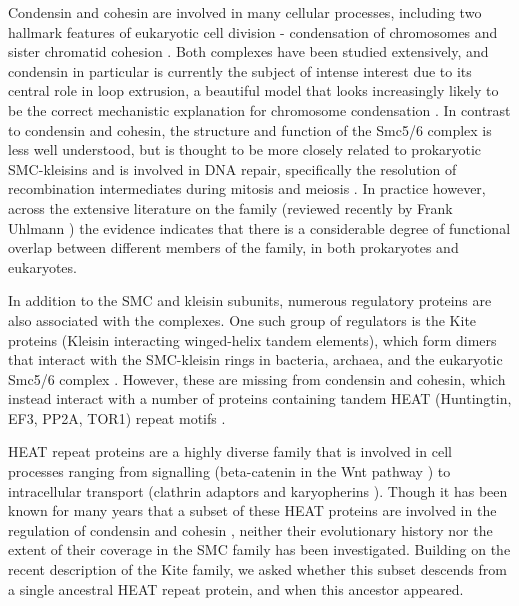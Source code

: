 \documentclass[a4paper,11pt,twoside,openright]{scrbook}
\begin{document}
Condensin and cohesin are involved in many cellular processes, including two
hallmark features of eukaryotic cell division - condensation of chromosomes and
sister chromatid cohesion \cite{Wood2010}. Both complexes have been studied
extensively, and condensin in particular is currently the subject of intense
interest due to its central role in loop extrusion, a beautiful model that looks
increasingly likely to be the correct mechanistic explanation for chromosome
condensation \cite{Nasmyth2001a,Alipour2012,Goloborodko2016,Wang2017}. In
contrast to condensin and cohesin, the structure and function of the Smc5/6
complex is less well understood, but is thought to be more closely related to
prokaryotic SMC-kleisins \cite{Palecek2015} and is involved in DNA repair,
specifically the resolution of recombination intermediates during mitosis and
meiosis \cite{Ampatzidou2006,Farmer2011}. In practice however, across the
extensive literature on the family (reviewed recently by Frank Uhlmann
\cite{Uhlmann2016}) the evidence indicates that there is a considerable degree
of functional overlap between different members of the family, in both
prokaryotes and eukaryotes.

In addition to the SMC and kleisin subunits, numerous regulatory proteins are
also associated with the complexes. One such group of regulators is the Kite
proteins (Kleisin interacting winged-helix tandem elements), which form dimers
that interact with the SMC-kleisin rings in bacteria, archaea, and the
eukaryotic Smc5/6 complex \cite{Palecek2015}. However, these are missing from
condensin and cohesin, which instead interact with a number of proteins
containing tandem HEAT (Huntingtin, EF3, PP2A, TOR1) repeat motifs
\cite{Andrade1995}.

HEAT repeat proteins are a highly diverse family that is involved in cell
processes ranging from signalling (beta-catenin in the Wnt pathway
\cite{Morin1999}) to intracellular transport (clathrin adaptors
\cite{McMahon2004} and karyopherins \cite{Chook2011}). Though it has been known
for many years that a subset of these HEAT proteins are involved in the
regulation of condensin and cohesin \cite{Neuwald2000}, neither their
evolutionary history nor the extent of their coverage in the SMC family has been
investigated. Building on the recent description of the Kite family, we asked
whether this subset descends from a single ancestral HEAT repeat protein, and
when this ancestor appeared.
\end{document}
